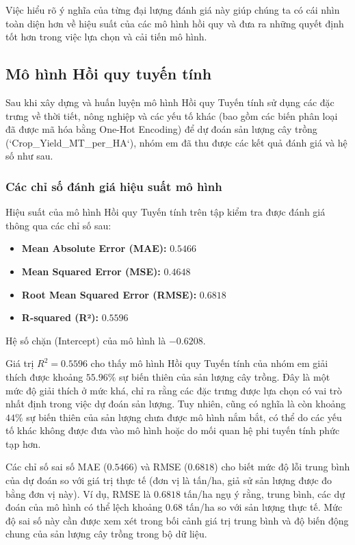 Việc hiểu rõ ý nghĩa của từng đại lượng đánh giá này giúp chúng ta có cái nhìn toàn diện hơn về hiệu suất của các mô hình hồi quy và đưa ra những quyết định tốt hơn trong việc lựa chọn và cải tiến mô hình.






\subsection{Mô hình Hồi quy tuyến tính}
\label{subsec:linear_regression_results}

Sau khi xây dựng và huấn luyện mô hình Hồi quy Tuyến tính sử dụng các đặc trưng về thời tiết, nông nghiệp và các yếu tố khác (bao gồm các biến phân loại đã được mã hóa bằng One-Hot Encoding) để dự đoán sản lượng cây trồng (`Crop\_Yield\_MT\_per\_HA`), nhóm em đã thu được các kết quả đánh giá và hệ số như sau. 

\subsubsection{Các chỉ số đánh giá hiệu suất mô hình}
\label{subsubsec:lr_performance_metrics}

Hiệu suất của mô hình Hồi quy Tuyến tính trên tập kiểm tra được đánh giá thông qua các chỉ số sau:
\begin{itemize}
    \item \textbf{Mean Absolute Error (MAE):} $0.5466$
    \item \textbf{Mean Squared Error (MSE):} $0.4648$
    \item \textbf{Root Mean Squared Error (RMSE):} $0.6818$
    \item \textbf{R-squared (R²):} $0.5596$
\end{itemize}
Hệ số chặn (Intercept) của mô hình là $-0.6208$.

Giá trị $R^2 = 0.5596$ cho thấy mô hình Hồi quy Tuyến tính của nhóm em giải thích được khoảng $55.96\%$ sự biến thiên của sản lượng cây trồng. Đây là một mức độ giải thích ở mức khá, chỉ ra rằng các đặc trưng được lựa chọn có vai trò nhất định trong việc dự đoán sản lượng. Tuy nhiên, cũng có nghĩa là còn khoảng $44\%$ sự biến thiên của sản lượng chưa được mô hình nắm bắt, có thể do các yếu tố khác không được đưa vào mô hình hoặc do mối quan hệ phi tuyến tính phức tạp hơn.

Các chỉ số sai số MAE ($0.5466$) và RMSE ($0.6818$) cho biết mức độ lỗi trung bình của dự đoán so với giá trị thực tế (đơn vị là tấn/ha, giả sử sản lượng được đo bằng đơn vị này). Ví dụ, RMSE là $0.6818$ tấn/ha ngụ ý rằng, trung bình, các dự đoán của mô hình có thể lệch khoảng $0.68$ tấn/ha so với sản lượng thực tế. Mức độ sai số này cần được xem xét trong bối cảnh giá trị trung bình và độ biến động chung của sản lượng cây trồng trong bộ dữ liệu.

